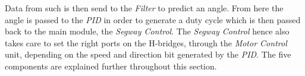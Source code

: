 Data from such is then send to the \textit{Filter} to predict an angle.
From here the angle is passed to the \textit{PID} in order to generate a duty cycle which is then passed back to the main module, the \textit{Segway Control}.
The \textit{Segway Control} hence also takes care to set the right ports on the H-bridges, through the \textit{Motor Control} unit, depending on the speed and direction bit generated by the \textit{PID}.
The five components are explained further throughout this section.
